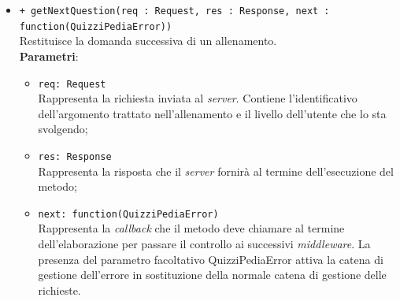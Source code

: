 \begin{itemize}
\begin{itemize}
\begin{itemize}
			\end{itemize}
			\item \texttt{+ getNextQuestion(req : Request, res : Response, next : function(QuizziPediaError))} \\
			Restituisce la domanda successiva di un allenamento.  \\
			\textbf{Parametri}:
			\begin{itemize}
			\item \texttt{req: Request} \\
			Rappresenta la richiesta inviata al \textit{server}. Contiene l'identificativo dell'argomento trattato nell'allenamento e il livello dell'utente che lo sta svolgendo;
			\item \texttt{res: Response} \\
			Rappresenta la risposta che il \textit{server} fornirà al termine dell'esecuzione del metodo;
			\item \texttt{next: function(QuizziPediaError)} \\
			Rappresenta la \textit{callback} che il metodo deve chiamare al termine dell'elaborazione per passare il controllo ai successivi \textit{middleware}. La presenza del parametro facoltativo QuizziPediaError attiva la catena di gestione dell'errore in sostituzione della normale catena di gestione delle richieste.
			\end{itemize}
		\end{itemize}
\end{itemize}